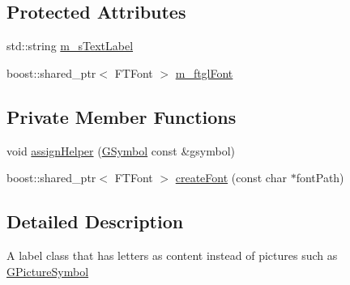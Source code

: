 \subsection*{Protected Attributes}
\begin{DoxyCompactItemize}
\item 
std::string \hyperlink{classOpenViBEApplications_1_1GSymbol_af901c52795dac9bbe644eb7fa58664be}{m\_\-sTextLabel}
\item 
boost::shared\_\-ptr$<$ FTFont $>$ \hyperlink{classOpenViBEApplications_1_1GSymbol_a3d8dc4f93343e955b77f6a8a3e923fd3}{m\_\-ftglFont}
\end{DoxyCompactItemize}
\subsection*{Private Member Functions}
\begin{DoxyCompactItemize}
\item 
void \hyperlink{classOpenViBEApplications_1_1GSymbol_a2fa0b57365fb6b63e66fc7c4a1481fdf}{assignHelper} (\hyperlink{classOpenViBEApplications_1_1GSymbol}{GSymbol} const \&gsymbol)
\item 
boost::shared\_\-ptr$<$ FTFont $>$ \hyperlink{classOpenViBEApplications_1_1GSymbol_aeb8ea4caf31b920ac2c30282e452f80c}{createFont} (const char $\ast$fontPath)
\end{DoxyCompactItemize}


\subsection{Detailed Description}
A label class that has letters as content instead of pictures such as \hyperlink{classOpenViBEApplications_1_1GPictureSymbol}{GPictureSymbol} 

